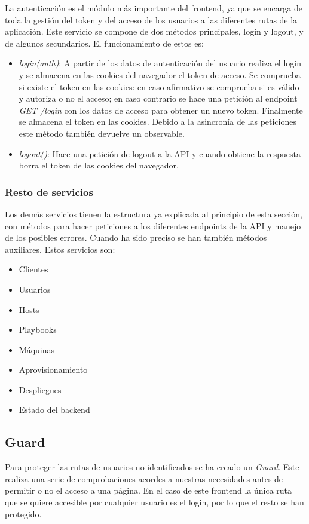 La autenticación es el módulo más importante del frontend, ya que se encarga de toda la gestión del token y del acceso de los usuarios a las diferentes rutas de la aplicación. Este servicio se compone de dos métodos principales, login y logout, y de algunos secundarios. El funcionamiento de estos es:
\begin{itemize}
	\item \textit{login(auth)}: A partir de los datos de autenticación del usuario realiza el login y se almacena en las cookies del navegador el token de acceso. Se comprueba si existe el token en las cookies: en caso afirmativo se comprueba si es válido y autoriza o no el acceso; en caso contrario se hace una petición al endpoint \textit{GET /login} con los datos de acceso para obtener un nuevo token. Finalmente se almacena el token en las cookies. Debido a la asincronía de las peticiones este método también devuelve un observable.
	\item \textit{logout()}: Hace una petición de logout a la API y cuando obtiene la respuesta borra el token de las cookies del navegador.
\end{itemize}



\subsubsection{Resto de servicios}

Los demás servicios tienen la estructura ya explicada al principio de esta sección, con métodos para hacer peticiones a los diferentes endpoints de la API y manejo de los posibles errores. Cuando ha sido preciso se han también métodos auxiliares. Estos servicios son:
\begin{itemize}
	\item Clientes
	\item Usuarios
	\item Hosts
	\item Playbooks
	\item Máquinas
	\item Aprovisionamiento
	\item Despliegues
	\item Estado del backend
\end{itemize}


\subsection{Guard}

Para proteger las rutas de usuarios no identificados se ha creado un \textit{Guard}. Este realiza una serie de comprobaciones acordes a nuestras necesidades antes de permitir o no el acceso a una página. En el caso de este frontend la única ruta que se quiere accesible por cualquier usuario es el login, por lo que el resto se han protegido.

